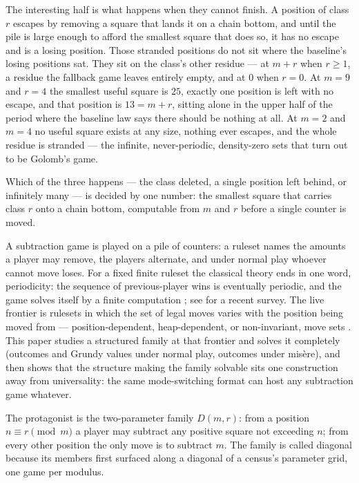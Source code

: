 The interesting half is what happens when they cannot finish. A position
of class $r$ escapes by removing a square that lands it on a chain bottom,
and until the pile is large enough to afford the smallest square that does
so, it has no escape and is a losing position. Those stranded positions do
not sit where the baseline's losing positions sat. They sit on the class's
other residue --- at $m + r$ when $r \ge 1$, a residue the fallback game
leaves entirely empty, and at $0$ when $r = 0$. At $m = 9$ and $r = 4$ the
smallest useful square is $25$, exactly one position is left with no
escape, and that position is $13 = m + r$, sitting alone in the upper half
of the period where the baseline law says there should be nothing at all.
At $m = 2$ and $m = 4$ no useful square exists at any size, nothing ever
escapes, and the whole residue is stranded --- the infinite,
never-periodic, density-zero sets that turn out to be Golomb's game.

Which of the three happens --- the class deleted, a single position left
behind, or infinitely many --- is decided by one number: the smallest
square that carries class $r$ onto a chain bottom, computable from $m$ and
$r$ before a single counter is moved.

A subtraction game is played on a pile of counters: a ruleset names the
amounts a player may remove, the players alternate, and under normal play
whoever cannot move loses. For a fixed finite ruleset the classical
theory ends in one word, periodicity: the sequence of previous-player
wins is eventually periodic, and the game solves itself by a finite
computation \cite{golomb}; see \cite{survey} for a recent survey. The
live frontier is rulesets in which the set of legal moves varies with the
position being moved from --- position-dependent, heap-dependent, or
non-invariant, move sets \cite{duchene-rigo, larsson-star, lhf}. This
paper studies a structured family at that frontier and solves it
completely (outcomes and Grundy values under normal play, outcomes under
mis\`ere), and then shows that the
structure making the family solvable sits one construction away from
universality: the same mode-switching format can host any subtraction
game whatever.

The protagonist is the two-parameter family $D(m, r)$: from a position
$n \equiv r \pmod m$ a player may subtract any positive square not
exceeding $n$; from every other position the only move is to subtract
$m$. The family is called diagonal because its members first surfaced
along a diagonal of a census's parameter grid, one game per modulus.

